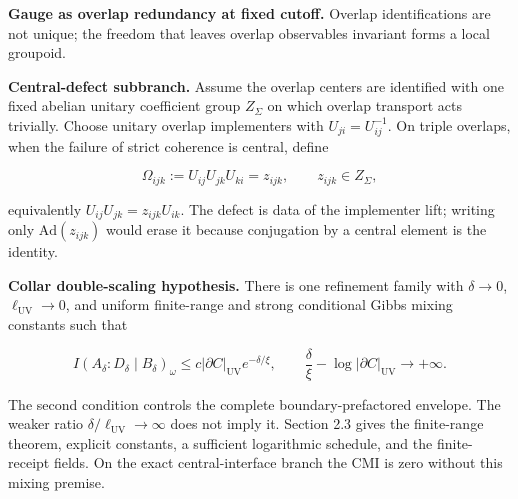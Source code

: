 \textbf{Gauge as overlap redundancy at fixed cutoff.} Overlap identifications are not unique; the freedom that leaves overlap observables invariant forms a local groupoid.

\textbf{Central-defect subbranch.} Assume the overlap centers are identified with one fixed
abelian unitary coefficient group \(Z_\Sigma\) on which overlap transport acts trivially. Choose
unitary overlap implementers with \(U_{ji}=U_{ij}^{-1}\). On triple overlaps, when the failure of
strict coherence is central, define

\[
\Omega_{ijk}:=U_{ij}U_{jk}U_{ki}=z_{ijk},
\qquad z_{ijk}\in Z_\Sigma,
\]

equivalently \(U_{ij}U_{jk}=z_{ijk}U_{ik}\). The defect is data of the implementer lift; writing only
\(\mathrm{Ad}(z_{ijk})\) would erase it because conjugation by a central element is the identity.

\textbf{Collar double-scaling hypothesis.} There is one refinement family with
\(\delta\to0\), \(\ell_{\mathrm{UV}}\to0\), and uniform finite-range and strong
conditional Gibbs mixing constants such that

\[
I(A_\delta:D_\delta \mid B_\delta)_\omega
\le c|\partial C|_{\mathrm{UV}}e^{-\delta/\xi},
\qquad
\frac{\delta}{\xi}-\log|\partial C|_{\mathrm{UV}}\longrightarrow+\infty.
\]

The second condition controls the complete boundary-prefactored envelope. The weaker ratio
\(\delta/\ell_{\mathrm{UV}}\to\infty\) does not imply it. Section 2.3 gives the
finite-range theorem, explicit constants, a sufficient logarithmic schedule, and the finite-receipt
fields. On the exact central-interface branch the CMI is zero without this mixing premise.

